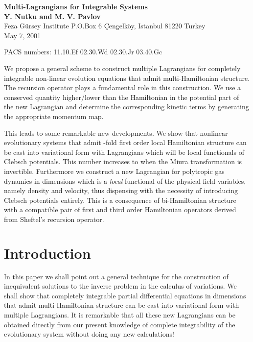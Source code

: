 \documentclass[a4paper,12pt]{article}
\begin{document}
\begin{center}
{\Large {\bf Multi-Lagrangians for Integrable Systems}}\\[4mm]
{\Large {\bf Y. Nutku and M. V. Pavlov}}\\[2mm] Feza G\"ursey
Institute P.O.Box 6 \c{C}engelk\"oy, Istanbul 81220 Turkey\\
May 7, 2001
\end{center}

PACS numbers: 11.10.Ef   02.30.Wd  02.30.Jr  03.40.Gc


We propose a general scheme to construct multiple Lagrangians for
completely integrable non-linear evolution equations that admit
multi-Hamilton\-ian structure. The recursion operator plays a
fundamental role in this construction. We use a conserved quantity
higher/lower than the Hamiltonian in the potential part of the new
Lagrangian and determine the corresponding kinetic terms by
generating the appropriate momentum map.

This leads to some remarkable new developments. We show that
nonlinear evolutionary systems that admit \coordHE{}-fold first order
local Hamiltonian structure can be cast into variational form with
\coordHE{} Lagrangians which will be local functionals of Clebsch
potentials. This number increases to \coordHE{} when the Miura
transformation is invertible. Furthermore we construct a new
Lagrangian for polytropic gas dynamics in \coordHE{} dimensions which
is a {\it local} functional of the physical field variables,
namely density and velocity, thus dispensing with the necessity of
introducing Clebsch potentials entirely. This is a consequence of
bi-Hamiltonian structure with a compatible pair of first and third
order Hamiltonian operators derived from Sheftel's recursion
operator.

\section{Introduction}

In this paper we shall point out a general technique for the
construction of inequivalent solutions to the inverse problem in
the calculus of variations. We shall show that completely
integrable partial differential equations in \coordHE{} dimensions that
admit multi-Hamiltonian structure can be cast into variational
form with multiple Lagrangians. It is remarkable that all these
new Lagrangians can be obtained directly from our present
knowledge of complete integrability of the evolutionary system
without doing any new calculations!
\end{document}
